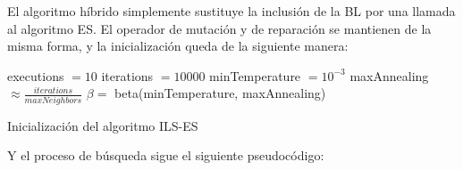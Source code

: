 El algoritmo híbrido simplemente sustituye la inclusión de la BL por una llamada al algoritmo ES. El operador de mutación y de reparación se mantienen de la misma forma, y la inicialización queda de la siguiente manera:

\vspace{\baselineskip}

\begin{algorithm}[H]
    \SetAlgoLined
        executions $= 10$ \;
        iterations $= 10000$ \;
        minTemperature $= 10^{-3}$ \;
        maxAnnealing $\approx \frac{iterations}{maxNeighbors}$ \;
        $\beta =$ beta(minTemperature, maxAnnealing) \;
    \caption{Inicialización del algoritmo ILS-ES}
\end{algorithm}

\vspace{\baselineskip}

Y el proceso de búsqueda sigue el siguiente pseudocódigo:

\vspace{1mm}

